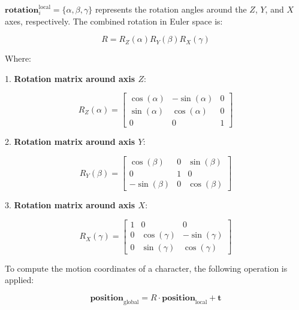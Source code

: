 
$\mathbf{rotation}_i^{\operatorname{local}} = \{ \alpha ,\beta , \gamma \}$ represents the rotation angles around the $Z$, $Y$, and $X$ axes, respectively. The combined rotation in Euler space is:

\begin{equation}
	R = R_Z(\alpha) R_Y(\beta) R_X(\gamma)
\end{equation}

Where:

1. \textbf{Rotation matrix around axis \(Z\)}:

\[
R_Z(\alpha) = 
\begin{bmatrix}
	\cos(\alpha) & -\sin(\alpha) & 0 \\
	\sin(\alpha) & \cos(\alpha) & 0 \\
	0 & 0 & 1
\end{bmatrix}
\]

2. \textbf{Rotation matrix around axis \(Y\)}:

\[
R_Y(\beta) = 
\begin{bmatrix}
	\cos(\beta) & 0 & \sin(\beta) \\
	0 & 1 & 0 \\
	-\sin(\beta) & 0 & \cos(\beta)
\end{bmatrix}
\]

3. \textbf{Rotation matrix around axis \(X\)}:

\[
R_X(\gamma) = 
\begin{bmatrix}
	1 & 0 & 0 \\
	0 & \cos(\gamma) & -\sin(\gamma) \\
	0 & \sin(\gamma) & \cos(\gamma)
\end{bmatrix}
\]

To compute the motion coordinates of a character, the following operation is applied:

\begin{equation}
	\mathbf{position}_{\text{global}} = R \cdot \mathbf{position}_{\text{local}} + \mathbf{t}
\end{equation}



